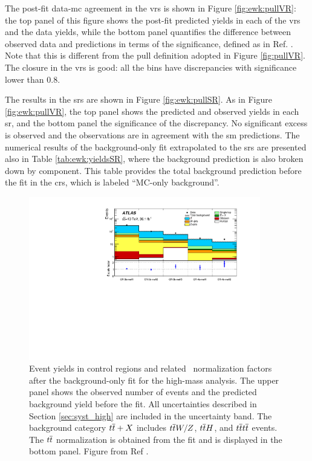 The post-fit data-\gls{mc} agreement in the \glspl{vr} is shown in Figure \ref{fig:ewk:pullVR}: the top panel of this figure 
shows the post-fit predicted yields in each of the \glspl{vr} and the data yields, while the bottom panel quantifies the 
difference between observed data and predictions in terms of the significance, defined as in Ref. \cite{Choudalakis:2011okv}. 
Note that this is different from the pull definition adopted in Figure \ref{fig:pullVR}. 
The closure in the \glspl{vr} is good: all the bins have discrepancies with significance lower than 0.8. 

The results in the \glspl{sr} are shown in Figure \ref{fig:ewk:pullSR}. As in Figure \ref{fig:ewk:pullVR}, the top panel shows the 
predicted and observed yields in each \gls{sr}, and the bottom panel the significance of the discrepancy. 
No significant excess is observed and the observations are in agreement with the \gls{sm} predictions. 
The numerical results of the background-only fit extrapolated to the \glspl{sr} are presented also in Table \ref{tab:ewk:yieldsSR},
where the background prediction is also broken down by component. 
This table provides the total background prediction before the fit in the \glspl{cr}, which is labeled ``MC-only background''.


\begin{figure}[htbp]
	\centering
	\includegraphics[width=0.9\textwidth]{figures/ewk_prod/etmiss_results/histpull_pulls_in_CR_qcdStrong}
	\caption{Event yields in control regions and related \ttbar\
          normalization factors after the background-only fit for
          the high-mass analysis. The upper panel shows 
		the observed number of events and the predicted background yield before the fit.
		All uncertainties described in Section \ref{sec:syst_high} are included in the uncertainty band. The background category $t\overline{t}+X$ includes $t\overline{t} W/Z$, $t\overline{t} H$, and $t\overline{t} t\overline{t}$ events.  
		The $t\overline{t}$ normalization is obtained from the fit
                and is displayed in the bottom panel. Figure from Ref \cite{Aaboud:2018htj}.
	} 
	\label{fig:ewk:pullCR}
\end{figure}


